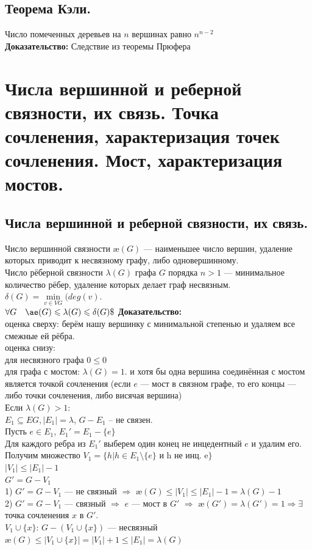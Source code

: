 \documentclass[12pt]{article}
\begin{document}
	\subsection{Теорема Кэли.}
		Число помеченных деревьев на $n$ вершинах равно $n^{n-2}$\\
	\textbf{Доказательство:}
		Следствие из теоремы Прюфера\\
	\qedsymbol

\section{Числа вершинной и реберной связности, их связь. Точка сочленения, характеризация точек сочленения. Мост, характеризация мостов.}
\subsection{Числа вершинной и реберной связности, их связь.}
	Число вершинной связности $æ(G)$ — наименьшее число вершин, удаление которых приводит к несвязному графу, либо одновершинному.\\
	Число рёберной связности $\lambda(G)$ графа $G$ порядка $n>1$ — минимальное количество рёбер, удаление которых делает граф несвязным.\\
	$\delta(G) = \underset{v \in VG}{\min}(deg(v)$.\\
	$\forall G \quad æ(G) \leqslant \lambda(G) \leqslant \delta(G)\$\\$
	\textbf{Доказательство:}\\
		оценка сверху: берём нашу вершинку с минимальной степенью и удаляем все смежные ей рёбра.\\
		оценка снизу:\\
		для несвязного графа $0 \leqslant 0$\\
		для графа с мостом: $\lambda(G) = 1$. и хотя бы одна вершина соединённая с мостом является точкой сочленения (если $e$ — мост в связном графе, то его концы — либо точки сочленения, либо висячая вершина)\\
		Если $\lambda(G) > 1$:\\
		$E_1 \subseteq EG,|E_1| = \lambda$, $G-E_1$ – не связен.\\
		Пусть $e \in E_1$, $E_1' = 	E_1 - \{e\}$\\
		Для каждого ребра из $E_1'$ выберем один конец не инцедентный $e$ и удалим его.\\
		Получим множество $V_1 = \{h | h \in E_1 \setminus \{e\}\text{ и h не инц. e}\}$\\
		$|V_1| \leqslant |E_1| - 1$\\
		$G' = G - V_1$\\
		1) $G' = G - V_1$ — не связный $\Rightarrow$ $æ(G) \leqslant |V_1| \leqslant |E_1| - 1 = \lambda(G) - 1$\\
		2) $G' = G - V_1$ — связный $\Rightarrow$ $e$ — мост в $G'$ $\Rightarrow$ $æ(G') = \lambda(G') = 1 \Rightarrow \exists$ точка сочленения $x$  в $G'$.\\
		$V_1 \cup \{x\}$: $G - (V_1 \cup \{x\})$ — несвязный\\
		$æ(G) \leqslant |V_1 \cup \{x\}| = |V_1| + 1 \leqslant |E_1| = \lambda(G)$\\
	\qedsymbol
\end{document}
